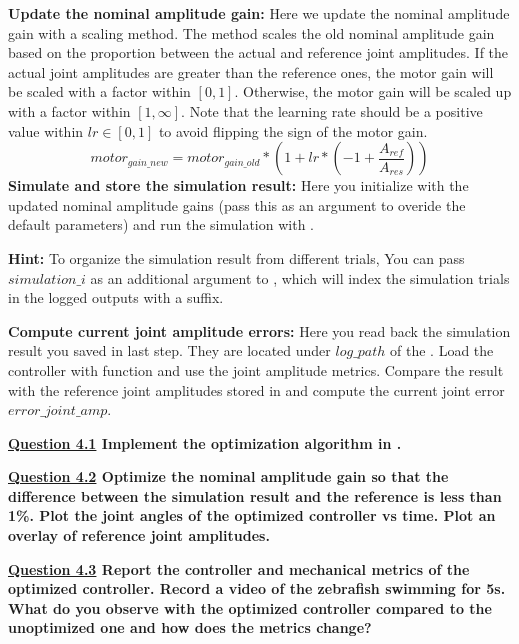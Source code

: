 \documentclass{cmc}
\begin{document}
\textbf{Update the nominal amplitude gain: }Here we update the nominal amplitude gain with a scaling method. The method scales the old nominal amplitude gain based on the proportion between the actual and reference joint amplitudes. If the actual joint amplitudes are greater than the reference ones, the motor gain will be scaled with a factor within $[0,1]$. Otherwise, the motor gain will be scaled up with a factor within $[1,\infty]$. Note that the learning rate  should be a positive value within $lr\in[0,1]$ to avoid flipping the sign of the motor gain.
\begin{equation}
  \label{eq:mo_gain_update}
  motor_{gain\_new} = motor_{gain\_old} * (1 + lr*(-1+\frac{A_{ref}}{A_{res}}))
\end{equation}
\textbf{Simulate and store the simulation result:} Here you initialize  with the updated nominal amplitude gains (pass this as an argument to overide the default parameters) and run the simulation with .

\textbf{Hint:} To organize the simulation result from different trials, You can pass $simulation\_i$ as an additional argument to , which will index the simulation trials in the logged outputs with a suffix.

\textbf{Compute current joint amplitude errors:} Here you read back the simulation result you saved in last step. They are located under $log\_path$ of the . Load the controller with  function and use the joint amplitude metrics. Compare the result with the reference joint amplitudes stored in  and compute the current joint error $error\_{joint\_amp}$.

\textbf{\underline{Question 4.1} Implement the optimization algorithm in . }

\textbf{\underline{Question 4.2} Optimize the nominal amplitude gain so that the difference between the simulation result and the reference is less than 1\%. Plot the joint angles of the optimized controller vs time. Plot an overlay of reference joint amplitudes. }

\textbf{\underline{Question 4.3} Report the controller and mechanical metrics of the optimized controller. Record a video of the zebrafish swimming for 5s. What do you observe with the optimized controller compared to the unoptimized one and how does the metrics change? }

\end{document}
